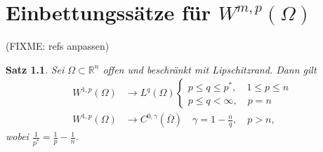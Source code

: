 \documentclass[
paper=a4,
bibtotocnumbered,
liststotocnumbered,
tablecaptionabove,
pointlessnumbers,
twoside,
openright,
10pt
]
{report}
\newtheorem{satz}[thm]{Satz}
\theoremstyle{definition}
\numberwithin{equation}{chapter}
\begin{document}
\chapter{Einbettungssätze für $W^{m,p}(\Omega)$} (FIXME: refs anpassen)
\begin{satz}\label{5.1} Sei $\Omega \subset \mathbb R^n$ offen und beschränkt mit Lipschitzrand. Dann gilt
\begin{align*}
W^{1,p}(\Omega) &\to L^q(\Omega) \begin{cases} p \le q \le p^*, \quad 1 \le p\le n\\  p \le q <\infty, \quad p =n \end{cases}\\
W^{1,p}(\Omega) &\to C^{0,\gamma}(\overline{\Omega}) \quad \gamma = 1- \frac{n}{q}, \quad p >n,
\end{align*}
wobei $\frac{1}{p^*}= \frac{1}{p}-\frac{1}{n}$.
\end{satz}
\end{document}
